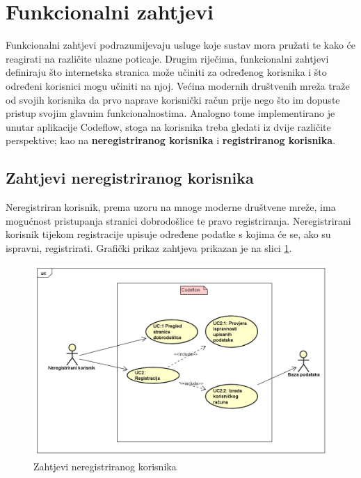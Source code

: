\documentclass[times, utf8, zavrsni]{fer}
\begin{document}
		\section{Funkcionalni zahtjevi}
		Funkcionalni zahtjevi podrazumijevaju usluge koje sustav mora pružati te kako će reagirati na različite ulazne poticaje. Drugim riječima, funkcionalni zahtjevi definiraju što internetska stranica može učiniti za određenog korisnika i što određeni korisnici mogu učiniti na njoj.
		Većina modernih društvenih mreža traže od svojih korisnika da prvo naprave korisnički račun prije nego što im dopuste pristup svojim glavnim funkcionalnostima. Analogno tome implementirano je unutar aplikacije Codeflow, stoga na korisnika treba gledati iz dvije različite perspektive; kao na \textbf{neregistriranog korisnika} i \textbf{registriranog korisnika}.
	
			\subsection{Zahtjevi neregistriranog korisnika}
			Neregistriran korisnik, prema uzoru na mnoge moderne društvene mreže, ima mogućnost pristupanja stranici dobrodošlice te pravo registriranja. Neregistrirani korisnik tijekom registracije upisuje određene podatke s kojima će se, ako su ispravni, registrirati. Grafički prikaz zahtjeva prikazan je na slici \ref{fig:zahtjevi-nereg}.
			\begin{figure}[H]
				\centering
				\includegraphics[width=\linewidth]{pictures/zahtjevi/nereg_korisnik.png}
				\caption{Zahtjevi neregistriranog korisnika}
				\label{fig:zahtjevi-nereg}
			\end{figure}
	
\end{document}

